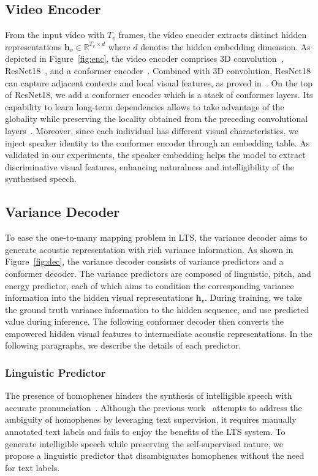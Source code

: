\documentclass[letterpaper]{article} %
\begin{document}
\subsection{Video Encoder}
From the input video with $T_v$ frames, the video encoder extracts distinct hidden representations $\boldsymbol{h}_v\in\mathbb{R}^{T_v\times d}$ where $d$ denotes the hidden embedding dimension. 
As depicted in Figure~\ref{fig:enc}, the video encoder comprises 3D convolution~\cite{ji20123d}, ResNet18~\cite{he2016deep}, and a conformer encoder~\cite{gulati2020conformer}. 
Combined with 3D convolution, ResNet18 can capture adjacent contexts and local visual features, as proved in~\cite{petridis2018end,ma2022visual}. 
On the top of ResNet18, we add a conformer encoder which is a stack of conformer layers. 
Its capability to learn long-term dependencies allows to take advantage of the globality while preserving the locality obtained from the preceding convolutional layers~\cite{guo2022cmt}.
Moreover, since each individual has different visual characteristics, we inject speaker identity to the conformer encoder through an embedding table.
As validated in our experiments, the speaker embedding helps the model to extract discriminative visual features, enhancing naturalness and intelligibility of the synthesised speech.
 
\subsection{Variance Decoder}
To ease the one-to-many mapping problem in LTS, the variance decoder aims to generate acoustic representation with rich variance information. 
As shown in Figure~\ref{fig:dec}, the variance decoder consists of variance predictors and a conformer decoder.
The variance predictors are composed of linguistic, pitch, and energy predictor, each of which aims to condition the corresponding variance information into the hidden visual representations $\boldsymbol{h}_v$.
During training, we take the ground truth variance information to the hidden sequence, and use predicted value during inference.
The following conformer decoder then converts the empowered hidden visual features to intermediate acoustic representations.
In the following paragraphs, we describe the details of each predictor.


\subsubsection{Linguistic Predictor}
The presence of homophenes hinders the synthesis of intelligible speech with accurate pronunciation~\cite{ephrat2017vid2speech}.
Although the previous work~\cite{kim2023lip} attempts to address the ambiguity of homophenes by leveraging text supervision, it requires manually annotated text labels and fails to enjoy the benefits of the LTS system. 
To generate intelligible speech while preserving the self-supervised nature, we propose a linguistic predictor that disambiguates homophenes without the need for text labels.
\end{document}
